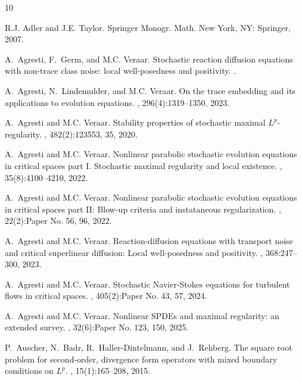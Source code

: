 \documentclass[reqno]{amsart}
\theoremstyle{plain}
\theoremstyle{remark}
\theoremstyle{plain}
\numberwithin{equation}{section}
\newcommand{\1}{\one}
\begin{document}
\def\polhk#1{\setbox0=\hbox{#1}{\ooalign{\hidewidth
  \lower1.5ex\hbox{`}\hidewidth\crcr\unhbox0}}} \def\cprime{$'$}
\begin{thebibliography}{10}

R.J. Adler and J.E. Taylor.
\newblock Springer Monogr. Math. New York, NY: Springer, 2007.

A.~Agresti, F.~Germ, and M.C. Veraar.
\newblock Stochastic reaction diffusion equations with non-trace class noise:
  local well-posedness and positivity.
.

A.~Agresti, N.~Lindemulder, and M.C. Veraar.
\newblock On the trace embedding and its applications to evolution equations.
, 296(4):1319--1350, 2023.

A.~Agresti and M.C. Veraar.
\newblock Stability properties of stochastic maximal {$L^p$}-regularity.
, 482(2):123553, 35, 2020.

A.~Agresti and M.C. Veraar.
\newblock Nonlinear parabolic stochastic evolution equations in critical spaces
  part {I}. {S}tochastic maximal regularity and local existence.
, 35(8):4100--4210, 2022.

A.~Agresti and M.C. Veraar.
\newblock Nonlinear parabolic stochastic evolution equations in critical spaces
  part {II}: {B}low-up criteria and instataneous regularization.
, 22(2):Paper No. 56, 96, 2022.

A.~Agresti and M.C. Veraar.
\newblock Reaction-diffusion equations with transport noise and critical
  superlinear diffusion: {L}ocal well-posedness and positivity.
, 368:247--300, 2023.

A.~Agresti and M.C. Veraar.
\newblock Stochastic {N}avier-{S}tokes equations for turbulent flows in
  critical spaces.
, 405(2):Paper No. 43, 57, 2024.

A.~Agresti and M.C. Veraar.
\newblock Nonlinear {SPDE}s and maximal regularity: an extended survey.
, 32(6):Paper No.
  123, 150, 2025.

P.~Auscher, N.~Badr, R.~Haller-Dintelmann, and J.~Rehberg.
\newblock The square root problem for second-order, divergence form operators
  with mixed boundary conditions on {$L^p$}.
, 15(1):165--208, 2015.


\end{thebibliography}
\end{document}
